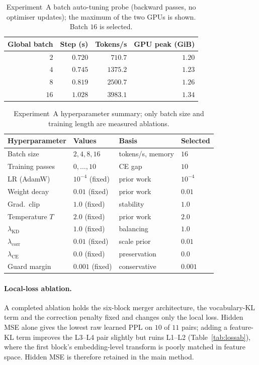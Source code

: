 \documentclass[10pt,a4paper]{article}
\newcommand{\ce}{\mathrm{CE}}
\begin{document}
\begin{table}[t]
\centering
\small
\begin{tabular}{rrrr}
\toprule
Global batch & Step (s) & Tokens/s & GPU peak (GiB) \\
\midrule
$2$  & $0.720$ & $710.7$  & $1.20$ \\
$4$  & $0.745$ & $1375.2$ & $1.23$ \\
$8$  & $0.819$ & $2500.7$ & $1.26$ \\
$16$ & $1.028$ & $3983.1$ & $1.34$ \\
\bottomrule
\end{tabular}
\caption{Experiment~A batch auto-tuning probe (backward passes, no optimiser
updates); the maximum of the two GPUs is shown. Batch $16$ is selected.}
\label{tab:batch}
\end{table}

\begin{table}[t]
\centering
\small
\begin{tabular}{llll}
\toprule
Hyperparameter & Values & Basis & Selected \\
\midrule
Batch size & $2,4,8,16$ & tokens/s, memory & $16$ \\
Training passes   & $0,\dots,10$    & CE gap & $10$ \\
LR (AdamW)        & $10^{-4}$ (fixed) & prior work & $10^{-4}$ \\
Weight decay      & $0.01$ (fixed)  & prior work & $0.01$ \\
Grad.\ clip       & $1.0$ (fixed)   & stability  & $1.0$ \\
Temperature $T$   & $2.0$ (fixed)   & prior work & $2.0$ \\
$\lambda_\text{KD}$ & $1.0$ (fixed) & balancing & $1.0$ \\
$\lambda_\text{corr}$ & $0.01$ (fixed) & scale prior & $0.01$ \\
$\lambda_\ce$ & $0.0$ (fixed) & preservation & $0.0$ \\
Guard margin      & $0.001$ (fixed) & conservative & $0.001$ \\
\bottomrule
\end{tabular}
\caption{Experiment~A hyperparameter summary; only batch size and training
length are measured ablations.}
\label{tab:ablation}
\end{table}

\paragraph{Local-loss ablation.} A completed ablation holds the six-block
merger architecture, the vocabulary-KL term and the correction penalty fixed
and changes only the local loss. Hidden MSE alone gives the lowest raw learned
PPL on $10$ of $11$ pairs; adding a feature-KL term improves the L3--L4 pair
slightly but ruins L1--L2 (Table~\ref{tab:lossab}), where the first block's
embedding-level transform is poorly matched in feature space. Hidden MSE is
therefore retained in the main method.
\end{document}
